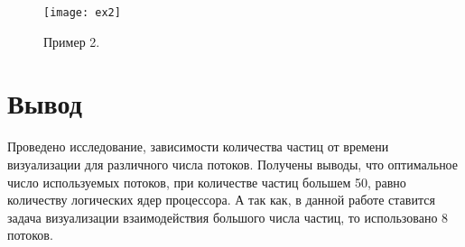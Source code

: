 \begin{figure}[H]
	\centering
	\texttt{[image: ex2]}
	\caption{Пример 2. }
	\label{img:ex2}
\end{figure}

\section{\textbf{Вывод}}

Проведено исследование, зависимости количества частиц от времени визуализации для различного числа потоков. Получены выводы, что оптимальное число используемых потоков, при количестве частиц большем 50, равно количеству логических ядер процессора. А так как, в данной работе ставится задача визуализации взаимодействия большого числа частиц, то использовано 8 потоков. 